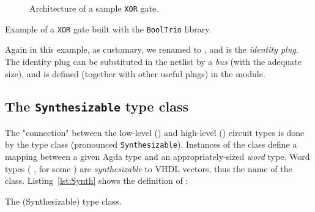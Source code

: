             \begin{figure}[ht]
                \caption{Architecture of a sample \texttt{XOR} gate.\label{fig:xor-sample}}
            \end{figure}

            \begin{listing}[ht]
                \newline
                \caption{Example of a \texttt{XOR} gate built with the \texttt{BoolTrio} library.\label{lst:xor-sample}}
            \end{listing}

            Again in this example, as customary, we renamed  to ,
            and  is the \emph{identity plug}.
            The identity plug can be substituted in the netlist by a \emph{bus} (with the adequate size),
            and is defined (together with other useful plugs) in the  module.


        \subsection{The \texttt{Synthesizable} type class}
        \label{subsec:synthesizable}
            The "connection" between the low-level () and high-level () circuit types
            is done by the  type class (pronounced \texttt{Synthesizable}).
            Instances of the  class define a mapping between a given Agda type
            and an appropriately-sized \emph{word} type.
            Word types ( , for some ) are \emph{synthesizable} to \ac{VHDL} vectors,
            thus the name of the class.
            Listing~\ref{lst:Synth} shows the definition of :

            \begin{listing}[ht]
                \newline
                \caption{The  (Synthesizable) type class.\label{lst:Synth}}
            \end{listing}

